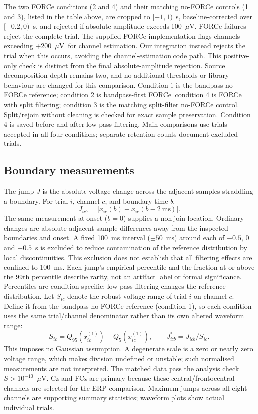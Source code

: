 \documentclass[11pt,a4paper]{article}
\newcommand{\uv}{\ensuremath{\mu\mathrm{V}}}
\begin{document}
The two FORCe conditions (2 and 4) and their matching no-FORCe controls (1 and 3), listed in the table above, are cropped to $[-1,1)$~s, baseline-corrected over $[-0.2,0)$~s, and rejected if absolute amplitude exceeds 100~\uv. FORCe failures reject the complete trial. The supplied FORCe implementation flags channels exceeding +200~\uv\ for channel estimation. Our integration instead rejects the trial when this occurs, avoiding the channel-estimation code path. This positive-only check is distinct from the final absolute-amplitude rejection. Source decomposition depth remains two, and no additional thresholds or library behaviour are changed for this comparison.
Condition 1 is the bandpass no-FORCe reference; condition 2 is bandpass-first FORCe; condition 4 is FORCe with split filtering; condition 3 is the matching split-filter no-FORCe control. Split/rejoin without cleaning is checked for exact sample preservation. Condition 4 is saved before and after low-pass filtering. Main comparisons use trials accepted in all four conditions; separate retention counts document excluded trials.
\subsection{Boundary measurements}
The jump $J$ is the absolute voltage change across the adjacent samples straddling a boundary. For trial $i$, channel $c$, and boundary time $b$,
\[
J_{icb}=|x_{ic}(b)-x_{ic}(b-2~\mathrm{ms})|.
\]
The same measurement at onset ($b=0$) supplies a non-join location. Ordinary changes are absolute adjacent-sample differences away from the inspected boundaries and onset. A fixed 100~ms interval ($\pm50$~ms) around each of $-0.5$, 0 and $+0.5$~s is excluded to reduce contamination of the reference distribution by local discontinuities. This exclusion does not establish that all filtering effects are confined to 100~ms. Each jump's empirical percentile and the fraction at or above the 99th percentile describe rarity, not an artifact label or formal significance. Percentiles are condition-specific; low-pass filtering changes the reference distribution.
Let $S_{ic}$ denote the robust voltage range of trial $i$ on channel $c$. Define it from the bandpass no-FORCe reference (condition 1), so each condition uses the same trial/channel denominator rather than its own altered waveform range:
\[
S_{ic}=Q_{95}(x^{(1)}_{ic})-Q_{5}(x^{(1)}_{ic}),\qquad J^*_{icb}=J_{icb}/S_{ic}.
\]
This imposes no Gaussian assumption. A degenerate scale is a zero or nearly zero voltage range, which makes division undefined or unstable; such normalised measurements are not interpreted. The matched data pass the analysis check $S>10^{-10}$~\uv. Cz and FCz are primary because these central/frontocentral channels are selected for the ERP comparison. Maximum jumps across all eight channels are supporting summary statistics; waveform plots show actual individual trials.
\end{document}
